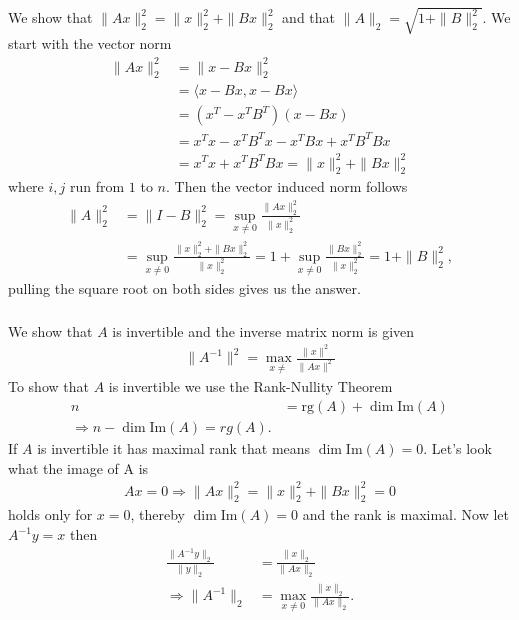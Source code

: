 \subsubsection{}
We show that $\|Ax\|_2^2 = \|x\|_2^2 + \|Bx\|_2^2$ and that $\|A\|_2 =
\sqrt{1+\|B\|_2^2}$. We start with the vector norm
\begin{align}
    \|Ax\|^2_2
    &= \|x - Bx\|_2^2 \\
    &= \langle x -Bx, x-Bx\rangle \\
    &= (x^T - x^T B^T)(x - Bx)\\
    &= x^T x - x^T B^T x - x^T Bx + x^T B^T Bx\\
    &= x^T x + x^TB^TBx = \|x\|_2^2 + \|Bx\|_2^2
\end{align}
where $i, j$ run from $1$ to $n$. Then the vector induced norm follows
\begin{align}
    \|A\|_2^2
    &= \|I-B\|_2^2 = \sup_{x\neq 0} \frac{\|Ax\|_2^2}{\|x\|^2_2}\\
    &= \sup_{x\neq 0} \frac{\|x\|^2_2 +\|Bx\|_2^2 }{\|x\|_2^2} = 1+
    \sup_{x\neq 0}\frac{\|Bx\|_2^2}{\|x\|^2_2}= 1+\|B\|_2^2,
\end{align}
pulling the square root on both sides gives us the answer.
\subsubsection{}
We show that $A$ is invertible and the inverse matrix norm is given
\begin{align}
    \|A^{-1}\|^2 = \max_{x\neq}\frac{\|x\|^2}{\|Ax\|^2}
\end{align}
To show that $A$ is invertible we use the Rank-Nullity Theorem
\begin{align}
    n &=\text{rg}(A) + \dim\text{Im}(A)\\
    \Rightarrow n - \dim\text{Im}(A) = rg(A).
\end{align}
If $A$ is invertible it has maximal rank that means $\dim \text{Im}(A) = 0$.
Let's look what the image of A is
\begin{align}
    Ax = 0 \Rightarrow \|Ax\|_2^2 = \|x\|_2^2 + \|Bx\|_2^2 = 0
\end{align}
holds only for $x = 0$, thereby $\dim \text{Im}(A) = 0$ and the rank is
maximal. Now let $A^{-1}y =x$ then
\begin{align}
    \frac{\|A^{-1}y\|_2}{\|y\|_2} &= \frac{\|x\|_2}{\|Ax\|_2}\\
    \Rightarrow \|A^{-1}\|_2 &= \max_{x\neq 0} \frac{\|x\|_2}{\|Ax\|_2}.
\end{align}
